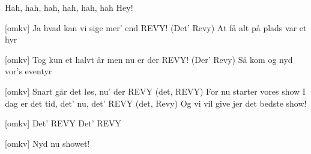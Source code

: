 \documentclass[a4paper,11pt]{article}
\begin{document}
\begin{song}
 Hah, hah, hah, hah, hah, hah
Hey!

[omkv]  Ja hvad kan vi sige mer’ end REVY!
(Det’ Revy)
At få alt på plads var et hyr

[omkv] Tog kun et halvt år men nu er der REVY!
(Der’ Revy)
Så kom og nyd vor’s eventyr

[omkv] Snart går det løs, nu' der REVY (det, REVY)
For nu starter vores show
I dag er det tid, det’ nu, det’ REVY
(det, Revy)
Og vi vil give jer det bedste show!

[omkv] Det’ REVY 
Det’ REVY

[omkv] Nyd nu showet!

\end{song}
\end{document}
